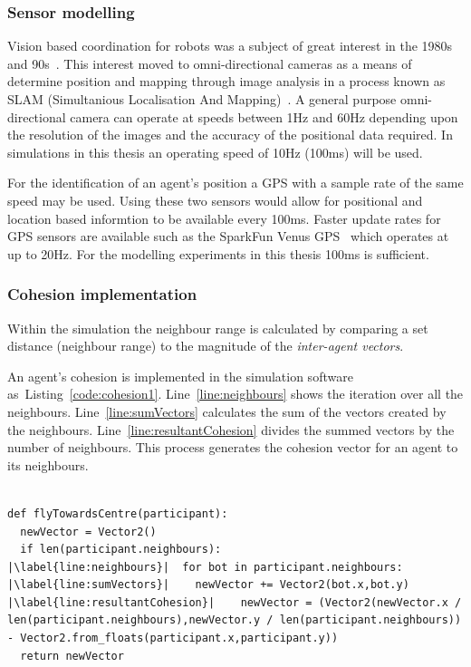 \subsubsection{Sensor modelling}
Vision based coordination for robots was a subject of great interest in the 1980s and 90s~\cite{DK:02}. This interest moved to omni-directional cameras as a means of determine position and mapping through image analysis in a process known as SLAM (Simultanious Localisation And Mapping)~\cite{TRI:15,SG:15}. A general purpose omni-directional camera can operate at speeds between 1Hz and 60Hz depending upon the resolution of the images and the accuracy of the positional data required. In simulations in this thesis an operating speed of 10Hz (100ms) will be used. 

For the identification of an agent's position a GPS with a sample rate of the same speed may be used. Using these two sensors would allow for positional and location based informtion to be available every 100ms. Faster update rates for GPS sensors are available such as the SparkFun Venus GPS~\cite{SF:16} which operates at up to 20Hz. For the modelling experiments in this thesis 100ms is sufficient.

\subsubsection{Cohesion implementation}
Within the simulation the neighbour range is calculated by comparing a set distance (neighbour range) to the magnitude of the \textit{inter-agent vectors}.

An agent's cohesion is implemented in the simulation software as~Listing~\ref{code:cohesion1}. Line~\ref{line:neighbours} shows the iteration over all the neighbours. Line~\ref{line:sumVectors} calculates the sum of the vectors created by the neighbours. Line~\ref{line:resultantCohesion} divides the summed vectors by the number of neighbours. This process generates the cohesion vector for an agent to its neighbours.

\lstset{language=Python,
basicstyle=\tiny,
numbers=left, 
numberstyle=\tiny,
captionpos=b,
frame=single,
breaklines=true,
caption=Cohesion code,
escapechar=|
} %
\begin{lstlisting}[label={code:cohesion1}]  % Start your code-block

def flyTowardsCentre(participant):
  newVector = Vector2()
  if len(participant.neighbours):
|\label{line:neighbours}|  for bot in participant.neighbours:
|\label{line:sumVectors}|    newVector += Vector2(bot.x,bot.y)
|\label{line:resultantCohesion}|    newVector = (Vector2(newVector.x / len(participant.neighbours),newVector.y / len(participant.neighbours)) - Vector2.from_floats(participant.x,participant.y))
  return newVector
\end{lstlisting}

